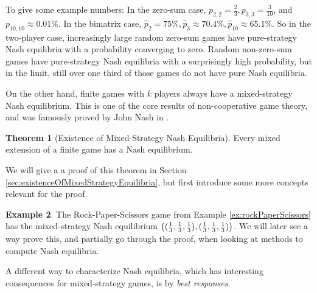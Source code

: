 \documentclass[a4paper]{scrreprt}
\theoremstyle{definition}
\newtheorem{thm}{Theorem}[chapter] %
\newtheorem{ex}[thm]{Example} %
\begin{document}
    To give some example numbers: In the zero-sum case, $p_{2, 2} = \frac{2}{3}, p_{3, 3}=\frac{3}{10}$, and $p_{10, 10} \approx 0.01\%$. In the bimatrix case, $\hat{p}_{2} = 75\%, \hat{p}_{3} \approx 70.4\%, \hat{p}_{10} \approx 65.1\%$.
    So in the two-player case, increasingly large random zero-sum games have pure-strategy Nash equilibria with a probability converging to zero. Random non-zero-sum games have pure-strategy Nash equilibria with a surprisingly high probability, but in the limit, still over one third of those games do not have pure Nash equilibria.
    
    On the other hand, finite games with $k$ players always have a mixed-strategy Nash equilibrium. This is one of the core results of non-cooperative game theory, and was famously proved by John Nash in \cite{bib:nashOnePageProofOfEquilibria}.
    
    \begin{thm}[Existence of Mixed-Strategy Nash Equilibria]
        Every mixed extension of a finite game has a Nash equilibrium.
        \label{thm:existenceOfMixedStrategyEquilibria}
    \end{thm}
    We will give a a proof of this theorem in Section \ref{sec:existenceOfMixedStrategyEquilibria}, but first introduce some more concepts relevant for the proof.
    
    \begin{ex} %
        The Rock-Paper-Scissors game from Example \ref{ex:rockPaperScissors}
        has the mixed-strategy Nash equilibrium $\bigl((\frac{1}{3}, \frac{1}{3}, \frac{1}{3}), (\frac{1}{3}, \frac{1}{3}, \frac{1}{3})\bigr)$.
        We will later see a way prove this, and partially go through the proof, when looking at methods to compute Nash equilibria.
    \end{ex}
    
    A different way to characterize Nash equilibria, which has interesting consequences for mixed-strategy games, is by \emph{best responses}.
    
\end{document}
